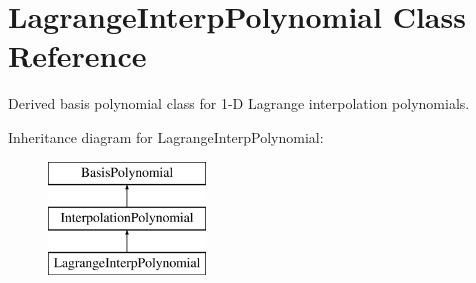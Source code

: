 \section{Lagrange\+Interp\+Polynomial Class Reference}
\label{classPecos_1_1LagrangeInterpPolynomial}


Derived basis polynomial class for 1-\/D Lagrange interpolation polynomials.  


Inheritance diagram for Lagrange\+Interp\+Polynomial\+:\begin{figure}[H]
\begin{center}
\leavevmode
\includegraphics[height=3.000000cm]{classPecos_1_1LagrangeInterpPolynomial}
\end{center}
\end{figure}
